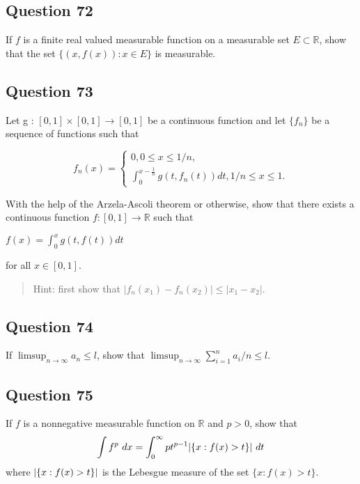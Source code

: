 \documentclass[12pt]{article}
\begin{document}
\hypertarget{question-72-1}{%
\subsection{Question 72}\label{question-72-1}}

If \(f\) is a finite real valued measurable function on a measurable set
\(E \subset \mathbb{R}\), show that the set \(\{(x, f(x)) : x \in E\}\)
is measurable.

\hypertarget{question-73-1}{%
\subsection{Question 73}\label{question-73-1}}

Let g : \([0, 1] \times [0, 1] \to [0, 1]\) be a continuous function and
let \(\{f_n\}\) be a sequence of functions such that

\[f_n(x)=\begin{cases}{0,   0\leq x\leq 1/n},\\{\int_0^{x-\frac1n} g(t,f_n(t))dt, 1/n\leq x \leq 1.}\end{cases}\]

With the help of the Arzela-Ascoli theorem or otherwise, show that there
exists a continuous function \(f : [0, 1] \to \mathbb{R}\) such that

\(f(x) = \int_0^x g(t, f(t))dt\)

for all \(x \in [0, 1]\).

\begin{quote}
Hint: first show that \(|f_n(x_1) - f_n(x_2)| \leq |x_1 - x_2|\).
\end{quote}

\hypertarget{question-74-1}{%
\subsection{Question 74}\label{question-74-1}}

If \(\limsup_{n\rightarrow \infty} a_n\leq l\), show that
\(\limsup_{n\rightarrow \infty}\sum_{i=1}^n{a_i/n}\leq l\).

\hypertarget{question-75-1}{%
\subsection{Question 75}\label{question-75-1}}

If \(f\) is a nonnegative measurable function on \(\mathbb{R}\) and
\(p > 0\), show that
\[\int f^p ~dx = \int_0^{\infty} p t^{p-1} {\left\lvert {\{x : f(x) > t\}} \right\rvert} ~dt\]
where \({\left\lvert {\{x : f(x) > t\}} \right\rvert}\) is the Lebesgue measure of the set
\(\{x : f(x) > t\}\).
\end{document}
